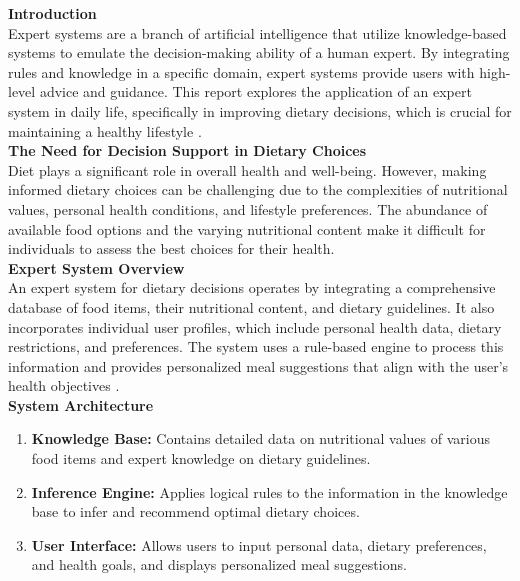 \documentclass[12pt,a4paper]{article}
\begin{document}
\textbf{Introduction}\\
\noindent Expert systems are a branch of artificial intelligence that utilize knowledge-based systems to emulate the decision-making ability of a human expert. By integrating rules and knowledge in a specific domain, expert systems provide users with high-level advice and guidance. This report explores the application of an expert system in daily life, specifically in improving dietary decisions, which is crucial for maintaining a healthy lifestyle \citep{question_1.1}.\\

\noindent \textbf{The Need for Decision Support in Dietary Choices }\\
Diet plays a significant role in overall health and well-being. However, making informed dietary choices can be challenging due to the complexities of nutritional values, personal health conditions, and lifestyle preferences. The abundance of available food options and the varying nutritional content make it difficult for individuals to assess the best choices for their health.\\

\noindent \textbf{Expert System Overview }\\
An expert system for dietary decisions operates by integrating a comprehensive database of food items, their nutritional content, and dietary guidelines. It also incorporates individual user profiles, which include personal health data, dietary restrictions, and preferences. The system uses a rule-based engine to process this information and provides personalized meal suggestions that align with the user’s health objectives \citep{question_1.2}. \\

\noindent \textbf{System Architecture }
\begin{enumerate}
    \item \textbf{Knowledge Base:} Contains detailed data on nutritional values of various food items and expert knowledge on dietary guidelines.
    \item \textbf{Inference Engine:} Applies logical rules to the information in the knowledge base to infer and recommend optimal dietary choices.
    \item \textbf{User Interface:} Allows users to input personal data, dietary preferences, and health goals, and displays personalized meal suggestions.
\end{enumerate}
\end{document}

